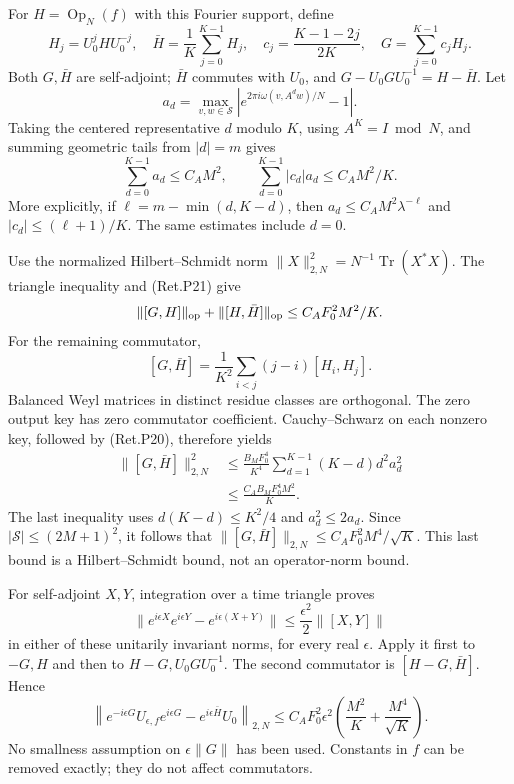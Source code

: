 For \(H=\operatorname{Op}_N(f)\) with this Fourier support, define
\[
 H_j=U_0^jHU_0^{-j},\quad
 \bar H=\frac1K\sum_{j=0}^{K-1}H_j,\quad
 c_j=\frac{K-1-2j}{2K},\quad G=\sum_{j=0}^{K-1}c_jH_j .
\]
Both \(G,\bar H\) are self-adjoint; \(\bar H\) commutes with \(U_0\), and
\(G-U_0GU_0^{-1}=H-\bar H\).
Let
\[
 a_d=\max_{v,w\in\mathcal S}
       |e^{2\pi i\omega(v,A^dw)/N}-1|.
\]
Taking the centered representative \(d\) modulo \(K\), using
\(A^K=I\bmod N\), and summing geometric tails from \(|d|=m\) gives
\[
 \sum_{d=0}^{K-1}a_d\le C_A M^2,\qquad
 \sum_{d=0}^{K-1}|c_d|a_d\le C_A M^2/K.                    \tag{Ret.P21}
\]
More explicitly, if \(\ell=m-\min(d,K-d)\), then
\(a_d\le C_A M^2\lambda^{-\ell}\) and
\(|c_d|\le(\ell+1)/K\). The same estimates include \(d=0\).

Use the normalized Hilbert--Schmidt norm
\(\|X\|_{2,N}^2=N^{-1}\operatorname{Tr}(X^*X)\).
The triangle inequality and (Ret.P21) give
\[
 \|[G,H]\|_{\rm op}+\|[H,\bar H]\|_{\rm op}
                       \le C_A F_0^2 M^2/K .
\]
For the remaining commutator,
\[
 [G,\bar H]=\frac1{K^2}\sum_{i<j}(j-i)[H_i,H_j].
\]
Balanced Weyl matrices in distinct residue classes are orthogonal.
The zero output key has zero commutator coefficient.
Cauchy--Schwarz on each nonzero key, followed by (Ret.P20), therefore yields
\[
 \begin{split}
 \|[G,\bar H]\|_{2,N}^2
 &\le\frac{B_MF_0^4}{K^4}
          \sum_{d=1}^{K-1}(K-d)d^2a_d^2\\
 &\le\frac{C_A B_MF_0^4 M^2}{K}.
 \end{split}                                               \tag{Ret.P22}
\]
The last inequality uses \(d(K-d)\le K^2/4\) and \(a_d^2\le2a_d\).
Since \(|\mathcal S|\le(2M+1)^2\), it follows that
\(\|[G,\bar H]\|_{2,N}\le C_A F_0^2M^4/\sqrt K\).
This last bound is a Hilbert--Schmidt bound, not an operator-norm bound.

For self-adjoint \(X,Y\), integration over a time triangle proves
\[
 \|e^{i\epsilon X}e^{i\epsilon Y}-e^{i\epsilon(X+Y)}\|
                      \le\frac{\epsilon^2}{2}\|[X,Y]\|
\]
in either of these unitarily invariant norms, for every real \(\epsilon\).
Apply it first to \(-G,H\) and then to \(H-G,U_0GU_0^{-1}\).
The second commutator is \([H-G,\bar H]\). Hence
\[
 \left\|e^{-i\epsilon G}U_{\epsilon,f}e^{i\epsilon G}
                          -e^{i\epsilon\bar H}U_0\right\|_{2,N}
 \le C_A F_0^2\epsilon^2
           \left(\frac{M^2}{K}+\frac{M^4}{\sqrt K}\right).    \tag{Ret.P23}
\]
No smallness assumption on \(\epsilon\|G\|\) has been used.
Constants in \(f\) can be removed exactly; they do not affect commutators.

